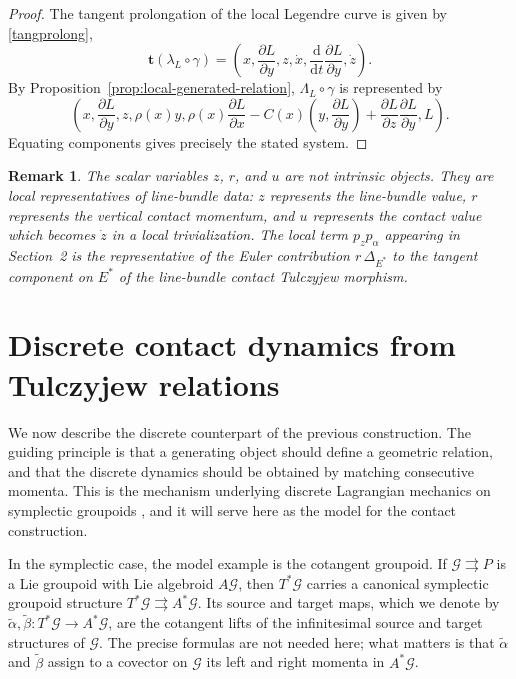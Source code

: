 \documentclass[11pt]{article}
\newtheorem{remark}[theorem]{Remark}
\newcommand{\dd}{\mathrm{d}}
\begin{document}
\begin{proof}
The tangent prolongation of the local Legendre curve is given by \eqref{tangprolong},
\[
\mathbf t(\lambda_L\circ\gamma)
=
\left(
x,
\frac{\partial L}{\partial y},
z,
\dot x,
\frac{\dd}{\dd t}\frac{\partial L}{\partial y},
\dot z
\right).
\]
By Proposition~\ref{prop:local-generated-relation}, \(\Lambda_L\circ\gamma\) is represented
by
\[
\left(
x,
\frac{\partial L}{\partial y},
z,
\rho(x)y,
\rho(x)\frac{\partial L}{\partial x}
-
C(x)\left(y,\frac{\partial L}{\partial y}\right)
+
\frac{\partial L}{\partial z}
\frac{\partial L}{\partial y},
L
\right).
\]
Equating components gives precisely the stated system.
\end{proof}

\begin{remark}
The scalar variables \(z\), \(r\), and \(u\) are not intrinsic objects. They are
local representatives of line-bundle data: \(z\) represents the line-bundle value,
\(r\) represents the vertical contact momentum, and \(u\) represents the contact
value which becomes \(\dot z\) in a local trivialization. The local term
\(p_zp_\alpha\) appearing in Section~2 is the representative of the Euler
contribution \(r\,\Delta_{E^*}\) to the tangent component on \(E^*\) of the
line-bundle contact Tulczyjew morphism.
\end{remark}

\section{Discrete contact dynamics from Tulczyjew relations}
\label{sec:discrete}

We now describe the discrete counterpart of the previous construction. The guiding
principle is that a generating object should define a geometric relation, and that
the discrete dynamics should be obtained by matching consecutive momenta. This is
the mechanism underlying discrete Lagrangian mechanics on symplectic groupoids
\cite{MarreroMartinDeDiegoStern2015,ColomboMartindeDiego2016,Colombo2014},
and it will serve here as the model for the contact construction.

In the symplectic case, the model example is the cotangent groupoid. If
\(\mathcal G\rightrightarrows P\) is a Lie groupoid with Lie algebroid
\(A\mathcal G\), then \(T^*\mathcal G\) carries a canonical symplectic groupoid
structure $T^*\mathcal G\rightrightarrows A^*\mathcal G$. Its source and target maps, which we denote by
$\widetilde\alpha,\widetilde\beta:T^*\mathcal G\longrightarrow A^*\mathcal G$, are the cotangent lifts of the infinitesimal source and target structures of
\(\mathcal G\). The precise formulas are not needed here; what matters is that
\(\widetilde\alpha\) and \(\widetilde\beta\) assign to a covector on
\(\mathcal G\) its left and right momenta in \(A^*\mathcal G\).
\end{document}
